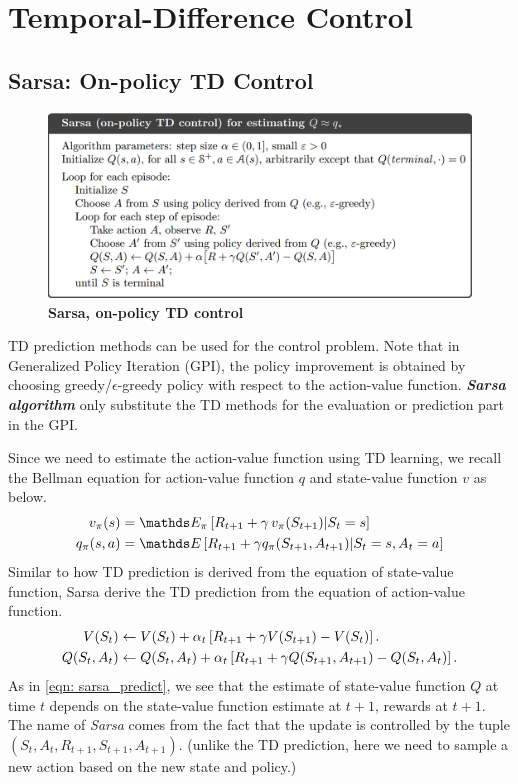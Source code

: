 \documentclass[11pt]{article}
\begin{document}
\section{Temporal-Difference Control}
\subsection{Sarsa: On-policy TD Control}
\begin{figure}
\begin{minipage}[t]{1\linewidth}
  \centering
  \centerline{\includegraphics[scale = 0.3]{sarsa_control.png}}
\end{minipage}
\caption{\footnotesize{\textbf{Sarsa, on-policy TD control}}}
\label{fig: sarsa_control}
\end{figure}
TD prediction methods can be used for the control problem. Note that in Generalized Policy Iteration (GPI), the policy improvement is obtained by choosing greedy/$\epsilon$-greedy policy with respect to the action-value function. \emph{\textbf{Sarsa algorithm}} only substitute the TD methods for the evaluation or prediction part in the GPI.  
  
Since we need to estimate the action-value function using TD learning, we recall the Bellman equation for action-value function $q$ and state-value function $v$ as below. 
\begin{align}
v_{\pi}(s) &=  \E{\pi}{R_{t+1}  + \gamma\,v_{\pi}(S_{t+1}) | S_{t} = s}  \nonumber\\
q_{\pi}(s, a) &= \E{}{R_{t+1} + \gamma q_{\pi}(S_{t+1}, A_{t+1}) | S_{t}=s, A_{t}=a} \label{eqn: bellman_eqn_value_action2}
\end{align} Similar to how TD prediction is derived from the equation of state-value function, Sarsa derive the TD prediction from the equation of action-value function.
\begin{align}
V(S_{t}) &\leftarrow V(S_{t}) + \alpha_{t}\left[R_{t+1} + \gamma V(S_{t+1})  - V(S_{t})\right]. \nonumber\\
Q(S_{t}, A_{t}) &\leftarrow Q(S_{t}, A_{t}) + \alpha_{t}\left[R_{t+1} + \gamma Q(S_{t+1}, A_{t+1})  - Q(S_{t}, A_{t})\right]. \label{eqn: sarsa_predict}
\end{align}  As in \eqref{eqn: sarsa_predict}, we see that the estimate of state-value function $Q$ at time $t$ depends on the state-value function estimate at $t+1$, rewards at $t+1$. The name of \emph{Sarsa} comes from the fact that the update is controlled by the tuple $(S_{t}, A_{t}, R_{t+1}, S_{t+1}, A_{t+1})$. (unlike the TD prediction, here we need to sample a new action based on the new state and policy.)
\end{document}
